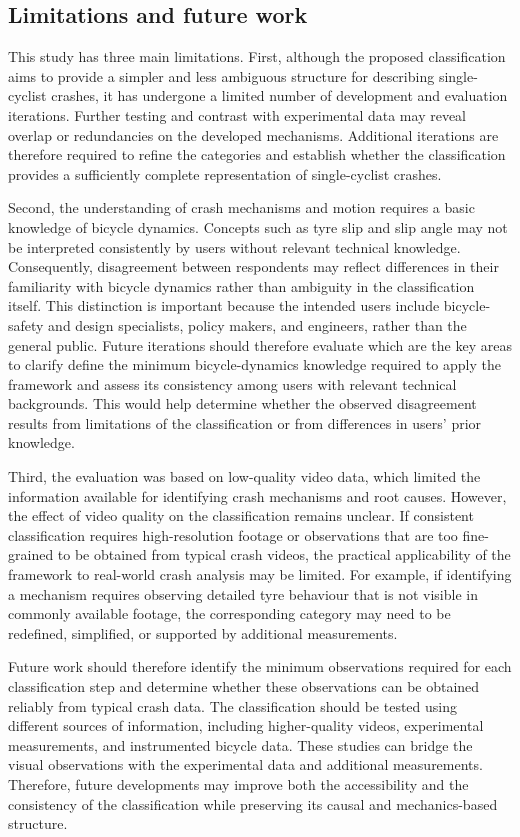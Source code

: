 \documentclass{article}
\begin{document}
\subsection{Limitations and future work}
%
This study has three main limitations. 
%
First, although the proposed classification aims to provide a simpler and less ambiguous structure for describing single-cyclist crashes, it has undergone a limited number of development and evaluation iterations.
%
Further testing and contrast with experimental data may reveal overlap or redundancies on the developed mechanisms.
%
Additional iterations are therefore required to refine the categories and establish whether the classification provides a sufficiently complete representation of single-cyclist crashes.


Second, the understanding of crash mechanisms and motion requires a basic knowledge of bicycle dynamics.
%
Concepts such as tyre slip and slip angle may not be interpreted consistently by users without relevant technical knowledge.
%
Consequently, disagreement between respondents may reflect differences in their familiarity with bicycle dynamics rather than ambiguity in the classification itself.
%
This distinction is important because the intended users include bicycle-safety and design specialists, policy makers, and engineers, rather than the general public.
%
Future iterations should therefore evaluate which are the key areas to clarify 
define the minimum bicycle-dynamics knowledge required to apply the framework and assess its consistency among users with relevant technical backgrounds. 
%
This would help determine whether the observed disagreement results from limitations of the classification or from differences in users' prior knowledge.


Third, the evaluation was based on low-quality video data, which limited the information available for identifying crash mechanisms and root causes. 
%
However, the effect of video quality on the classification remains unclear. 
%
If consistent classification requires high-resolution footage or observations that are too fine-grained to be obtained from typical crash videos, the practical applicability of the framework to real-world crash analysis may be limited. 
%
For example, if identifying a mechanism requires observing detailed tyre behaviour that is not visible in commonly available footage, the corresponding category may need to be redefined, simplified, or supported by additional measurements. 


Future work should therefore identify the minimum observations required for each classification step and determine whether these observations can be obtained reliably from typical crash data.
The classification should be tested using different sources of information, including higher-quality videos, experimental measurements, and instrumented bicycle data. 
%
These studies can bridge the visual observations with the experimental data and additional measurements.
%
Therefore, future developments may improve both the accessibility and the consistency of the classification while preserving its causal and mechanics-based structure.
\end{document}
